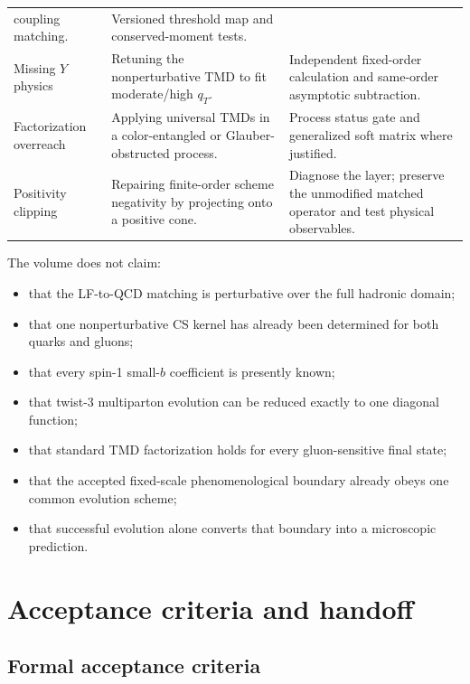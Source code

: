 \documentclass[11pt]{article}
\begin{document}
\begin{longtable}{L{0.22\textwidth}L{0.34\textwidth}L{0.36\textwidth}}
coupling matching. & Versioned threshold map and conserved-moment tests.\\
Missing \(Y\) physics & Retuning the nonperturbative TMD to fit moderate/high
\(q_T\). & Independent fixed-order calculation and same-order asymptotic
subtraction.\\
Factorization overreach & Applying universal TMDs in a color-entangled or
Glauber-obstructed process. & Process status gate and generalized soft matrix
where justified.\\
Positivity clipping & Repairing finite-order scheme negativity by projecting
onto a positive cone. & Diagnose the layer; preserve the unmodified matched
operator and test physical observables.\\
\bottomrule
\end{longtable}

The volume does not claim:
\begin{itemize}
\item that the LF-to-QCD matching is perturbative over the full hadronic
      domain;
\item that one nonperturbative CS kernel has already been determined for both
      quarks and gluons;
\item that every spin-1 small-\(b\) coefficient is presently known;
\item that twist-3 multiparton evolution can be reduced exactly to one
      diagonal function;
\item that standard TMD factorization holds for every gluon-sensitive final
      state;
\item that the accepted fixed-scale phenomenological boundary already obeys
      one common evolution scheme;
\item that successful evolution alone converts that boundary into a
      microscopic prediction.
\end{itemize}

\section{Acceptance criteria and handoff}
\label{sec:acceptance}

\subsection{Formal acceptance criteria}
\end{document}
